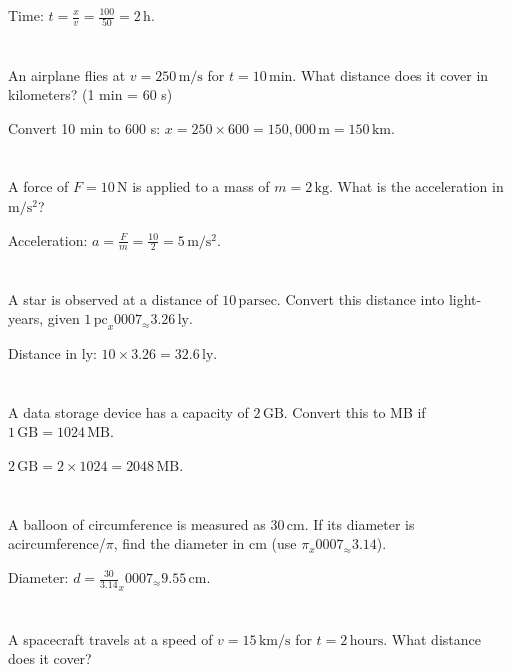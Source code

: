 \documentclass{article}
\begin{document}
Time: \( t = \frac{x}{v} = \frac{100}{50} = 2 \, \mathrm{h} \).

\section{}
An airplane flies at \( v = 250 \, \mathrm{m/s} \) for \( t = 10 \, \mathrm{min} \). What distance does it cover in kilometers? (1 min = 60 s)

Convert 10 min to 600 s: \( x = 250 \times 600 = 150{,}000 \, \mathrm{m} = 150 \, \mathrm{km} \).

\section{}
A force of \( F = 10 \, \mathrm{N} \) is applied to a mass of \( m = 2 \, \mathrm{kg} \). What is the acceleration in \(\mathrm{m/s^2}\)?

Acceleration: \( a = \frac{F}{m} = \frac{10}{2} = 5 \, \mathrm{m/s^2} \).

\section{}
A star is observed at a distance of \( 10 \, \mathrm{parsec} \). Convert this distance into light-years, given \(1 \, \mathrm{pc} _x0007_\approx 3.26 \, \mathrm{ly}\).

Distance in ly: \( 10 \times 3.26 = 32.6 \, \mathrm{ly} \).

\section{}
A data storage device has a capacity of \( 2 \, \mathrm{GB} \). Convert this to MB if \(1 \, \mathrm{GB} = 1024 \, \mathrm{MB}\).

\( 2 \, \mathrm{GB} = 2 \times 1024 = 2048 \, \mathrm{MB} \).

\section{}
A balloon of circumference is measured as \( 30 \, \mathrm{cm} \). If its diameter is a\approximately circumference/\(\pi\), find the diameter in cm (use \(\pi _x0007_\approx 3.14\)).

Diameter: \( d = \frac{30}{3.14} _x0007_\approx 9.55 \, \mathrm{cm} \).

\section{}
A spacecraft travels at a speed of \( v = 15 \, \mathrm{km/s} \) for \( t = 2 \, \mathrm{hours} \). What distance does it cover?
\end{document}
